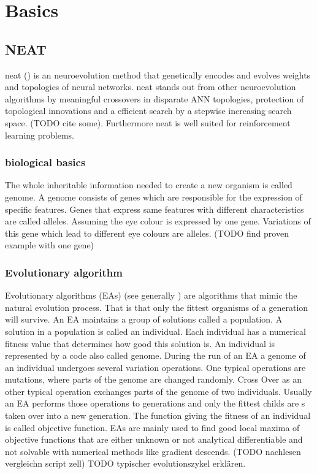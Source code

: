 
\chapter{Basics}\label{Basics}


\section{NEAT}\label{NEAT} %
\Gls{neat} (\cite{NEAT}) is an neuroevolution method that genetically encodes and evolves weights and topologies of neural networks. \gls{neat} stands out from other neuroevolution algorithms by meaningful crossovers in disparate ANN topologies, protection of topological innovations and a efficient search by a stepwise increasing search space. (TODO cite some). Furthermore \gls{neat} is well suited for reinforcement learning problems. 
\subsection{biological basics} 
The whole inheritable information needed to create a new organism is called genome. A genome consists of genes which are responsible for the expression of specific features. Genes that express same features with  different characteristics are called alleles. Assuming the eye colour is expressed by one gene.  Variations of this gene which lead to different eye colours are alleles. (TODO find proven example with one gene)
\subsection{Evolutionary algorithm} %
Evolutionary algorithms (EAs) (see generally \cite{book:IntroductionEA}) are algorithms that mimic the natural evolution process. That is that only the fittest organisms of a generation will survive. An EA maintains a group of solutions called a population. A solution in a population is called an individual. Each individual has a numerical fitness value that determines how good this solution is. An individual is represented by a code also called genome. During the run of an EA a genome of an individual undergoes several variation operations. One typical operations are mutations, where parts of the genome are changed randomly. Cross Over as an other typical operation exchanges parts of the genome of two individuals. Usually an EA performs those operations to generations and only the fittest childs are s taken over into a new generation. The function giving the fitness of an individual is called objective function. EAs are mainly used to find good local maxima of objective functions that are either unknown or not analytical differentiable and not solvable with numerical methods like gradient descends.  (TODO nachlesen vergleichn script zell)
TODO typischer evolutionszykel erklären.


